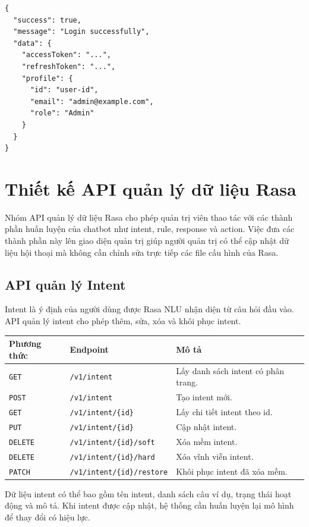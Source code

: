 \documentclass[12pt,a4paper]{report}
\begin{document}
\begin{verbatim}
{
  "success": true,
  "message": "Login successfully",
  "data": {
    "accessToken": "...",
    "refreshToken": "...",
    "profile": {
      "id": "user-id",
      "email": "admin@example.com",
      "role": "Admin"
    }
  }
}
\end{verbatim}

\section{Thiết kế API quản lý dữ liệu Rasa}

Nhóm API quản lý dữ liệu Rasa cho phép quản trị viên thao tác với các thành phần huấn luyện của chatbot như intent, rule, response và action. Việc đưa các thành phần này lên giao diện quản trị giúp người quản trị có thể cập nhật dữ liệu hội thoại mà không cần chỉnh sửa trực tiếp các file cấu hình của Rasa.

\subsection{API quản lý Intent}

Intent là ý định của người dùng được Rasa NLU nhận diện từ câu hỏi đầu vào. API quản lý intent cho phép thêm, sửa, xóa và khôi phục intent.

\begin{longtable}{|p{3cm}|p{5cm}|p{7cm}|}
\hline
\textbf{Phương thức} & \textbf{Endpoint} & \textbf{Mô tả} \\
\hline
\texttt{GET} & \texttt{/v1/intent} & Lấy danh sách intent có phân trang. \\
\hline
\texttt{POST} & \texttt{/v1/intent} & Tạo intent mới. \\
\hline
\texttt{GET} & \texttt{/v1/intent/\{id\}} & Lấy chi tiết intent theo id. \\
\hline
\texttt{PUT} & \texttt{/v1/intent/\{id\}} & Cập nhật intent. \\
\hline
\texttt{DELETE} & \texttt{/v1/intent/\{id\}/soft} & Xóa mềm intent. \\
\hline
\texttt{DELETE} & \texttt{/v1/intent/\{id\}/hard} & Xóa vĩnh viễn intent. \\
\hline
\texttt{PATCH} & \texttt{/v1/intent/\{id\}/restore} & Khôi phục intent đã xóa mềm. \\
\hline
\end{longtable}

Dữ liệu intent có thể bao gồm tên intent, danh sách câu ví dụ, trạng thái hoạt động và mô tả. Khi intent được cập nhật, hệ thống cần huấn luyện lại mô hình để thay đổi có hiệu lực.
\end{document}

